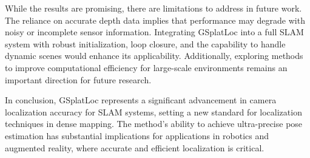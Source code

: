 \documentclass[twocolumn]{article}
\begin{document}
While the results are promising, there are limitations to address in
future work. The reliance on accurate depth data implies that
performance may degrade with noisy or incomplete sensor information.
Integrating GSplatLoc into a full SLAM system with robust
initialization, loop closure, and the capability to handle dynamic
scenes would enhance its applicability. Additionally, exploring methods
to improve computational efficiency for large-scale environments remains
an important direction for future research.

In conclusion, GSplatLoc represents a significant advancement in camera
localization accuracy for SLAM systems, setting a new standard for
localization techniques in dense mapping. The method's ability to
achieve ultra-precise pose estimation has substantial implications for
applications in robotics and augmented reality, where accurate and
efficient localization is critical.

\printbibliography
\end{document}
